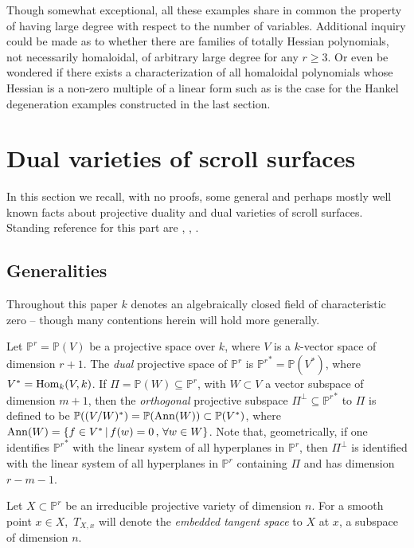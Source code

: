 \documentclass[11pt]{article}   %
\theoremstyle{definition}
\numberwithin{Theorem}{section} \numberwithin{equation}{section}
\newcommand{\Proj}{{\mathbb P}}
\newcommand{\p}{{\mathbb P}}
\begin{document}
Though somewhat exceptional, all these examples share in common the
property of having large degree with respect to the number of
variables. Additional inquiry could be made as to whether there are
families of totally Hessian polynomials, not necessarily homaloidal,
of arbitrary   large degree for any $r\geq
3$. Or even { be} wondered if there exists a
characterization of all homaloidal polynomials whose Hessian is a
non-zero multiple of a linear form such as is the case for the
Hankel degeneration examples constructed in the last section.

\section{Dual varieties of scroll
surfaces}\label{scrolls}


In this section we recall, with no proofs, some general and perhaps
mostly well known facts about projective
duality and dual varieties of scroll surfaces.   Standing
reference for this part {are}  \cite{Kleiman}, \cite{Zak1}, \cite{Ru}.

\subsection{Generalities}



Throughout this paper $k$ denotes {an algebraically closed} field of characteristic zero --
though many contentions herein will hold more generally.

Let $\p^ r=\p(V)$ be a projective space over $k$, where $V$ is a
$k$-vector space of dimension $r+1$. The {\it dual\/} projective
space of $\p^r$ is ${\p^ r}^
*=\p(V^ *)$, where $V^*={\rm Hom}_k(V,k)$. If $\Pi=\p(W)\subseteq \p^ r$, with $W\subset V$
a vector subspace of dimension $m+1$, then  the {\it orthogonal\/}
projective subspace $\Pi^ \perp\subseteq {\p^ r}^ *$ to $\Pi$ is
defined to be $\p((V/W)^*)=\p({\rm Ann}(W))\subset \p(V^*)$, where
${\rm Ann}(W)=\{f\in V^*\,|\, f(w)=0\, , \,\forall w\in W\}$. Note
that, geometrically, if one identifies ${\p^ r}^*$  with the linear system of
all hyperplanes in $\p^ r$, then $\Pi^ \perp$ is identified with the linear system
of all hyperplanes in $\p^ r$ containing $\Pi$ and has dimension
$r-m-1$.

Let $X\subset \Proj^ r$ be an irreducible projective variety of dimension $n$. For a
smooth point $x\in X$,  $\,T_{X,x}$ will denote the {\it embedded tangent space\/}
to $X$ at $x$, a subspace of dimension $n$.
\end{document}

